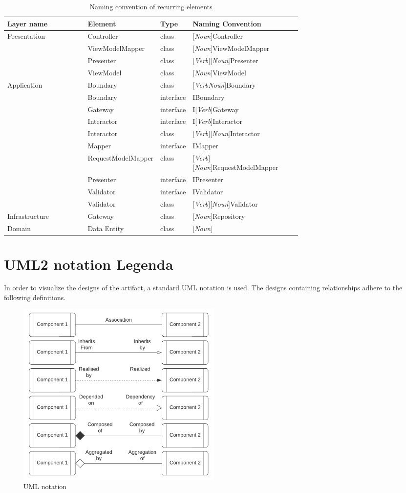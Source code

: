 \begin{table}[H]
  \footnotesize
  \begin{tabular}{ l p{0.24\linewidth} p{0.09\linewidth} p{0.37\linewidth} }
  \hline
  \textbf{Layer name} & \textbf{Element} & \textbf{Type} & \textbf{Naming Convention} \\ \hline
  Presentation & Controller & class & [\textit{Noun}]Controller \\
  & ViewModelMapper & class & [\textit{Noun}]ViewModelMapper \\
  & Presenter & class & [\textit{Verb}][\textit{Noun}]Presenter \\
  & ViewModel & class & [\textit{Noun}]ViewModel \\

  Application & Boundary & class & [\textit{VerbNoun}]Boundary \\
  & Boundary  & interface & IBoundary \\
  & Gateway  & interface & I[\textit{Verb}]Gateway \\
  & Interactor  & interface & I[\textit{Verb}]Interactor \\
  & Interactor & class & [\textit{Verb}][\textit{Noun}]Interactor \\
  & Mapper  & interface & IMapper \\
  & RequestModelMapper & class & [\textit{Verb}][\textit{Noun}]RequestModelMapper \\
  & Presenter  & interface & IPresenter \\
  & Validator  & interface & IValidator \\
  & Validator & class & [\textit{Verb}][\textit{Noun}]Validator \\
  
  Infrastructure & Gateway & class & [\textit{Noun}]Repository \\

  Domain & Data Entity & class & [\textit{Noun}] \\ \hline

  \end{tabular}
  \caption{Naming convention of recurring elements}
  \label{table_element_naming_convention}
\end{table}

\section{UML2 notation Legenda} \label{appendix_legenda} 

In order to visualize the designs of the artifact, a standard UML notation is used. The
designs containing relationships adhere to the following definitions.

\begin{figure}[H]
  \centering
  \includegraphics[width=0.5\textwidth]{figures/legenda.pdf}
  \caption[UML Notation used]{UML notation}
  \label{fi:class_diagram_relationship_notation}
\end{figure}